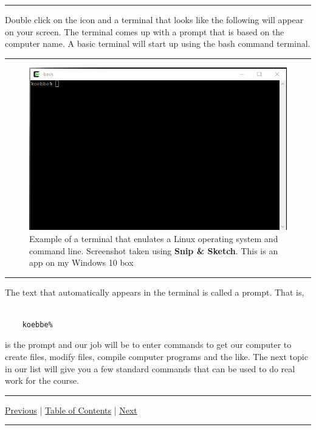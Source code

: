 \documentclass[10pt,fleqn]{article}
\begin{document}
\eject
\vskip0.1in\hrule\vskip0.1in
Double click on the icon and a terminal that looks like the following will
appear on your screen. The terminal comes up with a prompt that is based on the
computer name. A basic terminal will start up using the bash command terminal. 
\vskip0.1in\hrule\vskip0.1in
\vfill
\begin{figure}[h]
\centering
\includegraphics[width=6.0in]{../images/cygwin_01.png}
\caption{Example of a terminal that enulates a Linux operating system and
        command line. {Screenshot} taken using {\bf Snip \& Sketch}. This is
        an app on my Windows 10 box}
\end{figure}
\eject
\vskip0.1in\hrule\vskip0.1in
The text that automatically appears in the terminal is called a prompt. That
is,
\begin{verbatim}

    koebbe%

\end{verbatim}
is the prompt and our job will be to enter commands to get our computer to 
create files, modify files, compile computer programs and the like. The next
topic in our list will give you a few standard commands that can be used to
do real work for the course.
\vskip0.1in\hrule\vskip0.1in \noindent
  \href{../../topic_03/md/topic_03.md}{Previous} |
  \href{../../toc/md/topic_toc.md}{Table of Contents} |
  \href{../../topic_05/md/topic_05.md}{Next}
\vskip0.1in\hrule\vskip0.1in \noindent
\end{document}
